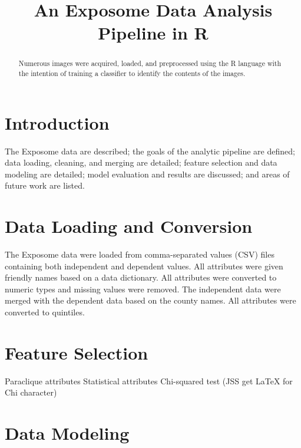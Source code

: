 \documentclass[conference,compsoc]{IEEEtran}
\begin{document}
\title{An Exposome Data Analysis Pipeline in R}

\author{
}

\maketitle

\begin{abstract}
Numerous images were acquired, loaded, and preprocessed using the R language with the intention of training a classifier to identify the contents of the images.
\end{abstract}

\section{Introduction}

The Exposome data are described; the goals of the analytic pipeline are defined; data loading,
cleaning, and merging are detailed; feature selection and data modeling are detailed; model evaluation and results are discussed;
and areas of future work are listed.

\section{Data Loading and Conversion}

The Exposome data were loaded from comma-separated values (CSV) files containing both independent and dependent values.
All attributes were given friendly names based on a data dictionary.
All attributes were converted to numeric types and missing values were removed.
The independent data were merged with the dependent data based on the county names.
All attributes were converted to quintiles.

\section{Feature Selection}

Paraclique attributes
Statistical attributes
Chi-squared test (JSS get LaTeX for Chi character)

\section{Data Modeling}
\end{document}
